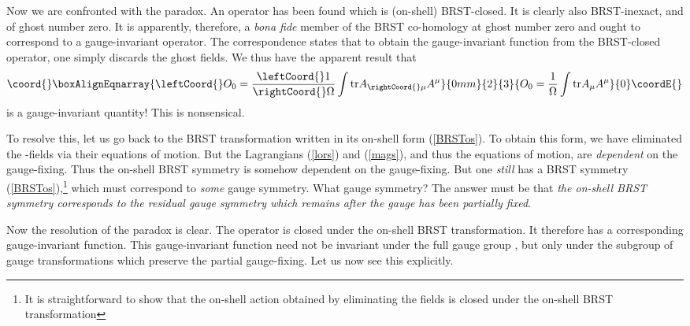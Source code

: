 \documentclass[a4paper,a4paper]{article}
\begin{document}
Now we are confronted with the paradox. An operator has been found which is (on-shell) BRST-closed. It is clearly also BRST-inexact, and of ghost number zero. It is apparently, therefore, a \emph{bona fide} member of the BRST co-homology at ghost number zero and ought to correspond to a gauge-invariant operator. The correspondence states \cite{Henneaux:1992ig} that to obtain the gauge-invariant function from the BRST-closed operator, one simply discards the ghost fields. We thus have the apparent result that
\begin{gather}\coord{}\boxAlignEqnarray{ \label{gi}
\leftCoord{}O_0 = \frac{\leftCoord{}1}{\rightCoord{}\Omega} \int \mathrm{tr} A_{\rightCoord{}\mu} A^{\mu}
}{0mm}{2}{3}{ O_0 = \frac{1}{\Omega} \int \mathrm{tr} A_{\mu} A^{\mu}
}{0}\coordE{}\end{gather}
is a gauge-invariant quantity! This is nonsensical.

To resolve this, let us go back to the BRST transformation written in its on-shell form (\ref{BRSTos}). To obtain this form, we have eliminated the \coordHE{}-fields via their equations of motion. But the Lagrangians (\ref{lors}) and (\ref{mags}), and thus the equations of motion, are \emph{dependent} on the gauge-fixing. Thus the on-shell BRST symmetry is somehow dependent on the gauge-fixing. But one \emph{still} has a BRST symmetry (\ref{BRSTos}),\footnote{It is straightforward to show that the on-shell action obtained by eliminating the \coordHE{} fields is closed under the on-shell BRST transformation} which must correspond to \emph{some} gauge symmetry. What gauge symmetry? The answer must be that \emph{the on-shell BRST symmetry corresponds to the residual gauge symmetry which remains after the gauge has been partially fixed}.

Now the resolution of the paradox is clear. The operator \coordHE{} is closed under the on-shell BRST transformation. It therefore has a corresponding gauge-invariant function. This gauge-invariant function need not be invariant under the full gauge group \coordHE{}, but only under the subgroup of gauge transformations which preserve the partial gauge-fixing. Let us now see this explicitly.
\end{document}
